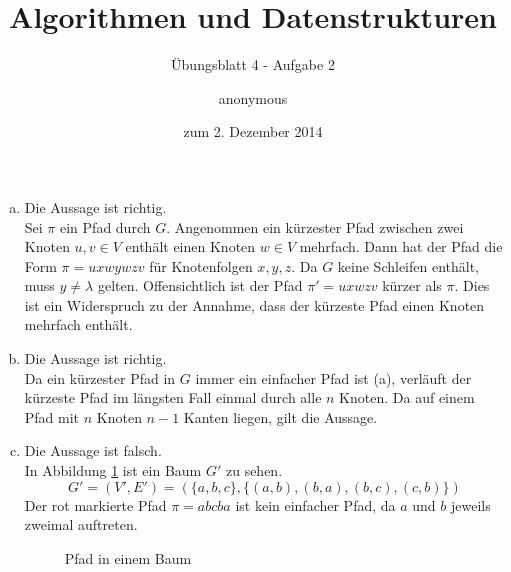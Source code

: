 \documentclass[a4paper]{scrartcl}
\title{Algorithmen und Datenstrukturen}
\subtitle{Übungsblatt 4 - Aufgabe 2}
\author{
    anonymous
}
\date{zum 2. Dezember 2014}
\begin{document}
\maketitle

\begin{enumerate}[(a)]
    \item
        Die Aussage ist richtig. \\
        Sei $\pi$ ein Pfad durch $G$.
        Angenommen ein kürzester Pfad zwischen zwei Knoten $u,v \in V$ enthält
        einen Knoten $w \in V$ mehrfach.
        Dann hat der Pfad die Form $\pi = uxwywzv$ für Knotenfolgen $x, y, z$.
        Da $G$ keine Schleifen enthält, muss $y \neq \lambda$ gelten.
        Offensichtlich ist der Pfad $\pi' = uxwzv$ kürzer als $\pi$.
        Dies ist ein Widerspruch zu der Annahme, dass der kürzeste Pfad einen
        Knoten mehrfach enthält.

    \item
        Die Aussage ist richtig. \\
        Da ein kürzester Pfad in $G$ immer ein einfacher Pfad ist (a), verläuft
        der kürzeste Pfad im längsten Fall einmal durch alle $n$ Knoten.
        Da auf einem Pfad mit $n$ Knoten $n-1$ Kanten liegen, gilt die Aussage.

    \item
        Die Aussage ist falsch. \\
        In Abbildung \ref{fig:tree-path} ist ein Baum $G'$ zu sehen.
        \begin{equation}
            G' = (V', E') = \left( \{a,b,c\}, \{ (a,b), (b,a), (b,c), (c,b) \} \right)
        \end{equation}
        Der rot markierte Pfad $\pi = abcba$ ist kein einfacher Pfad, da $a$
        und $b$ jeweils zweimal auftreten.
        \begin{figure}[h]
            \centering
            \caption{Pfad in einem Baum}
            \label{fig:tree-path}
        \end{figure}


\end{enumerate}
\end{document}
